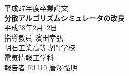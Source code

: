 
\begin{titlepage}
	\centering
	\vspace*{3.5cm}
	{\huge 平成27年度卒業論文}
	\vspace{1.5cm} \\
	{\huge \textbf{分散アルゴリズムシミュレータの改良}}
	\vspace{5cm} \\
	{\LARGE 平成28年2月12日}
	\vspace{1.0cm} \\
	{\LARGE 指導教員  濱田幸弘}
	\vspace{3.5cm} \\
	{\LARGE 明石工業高等専門学校}
	\vspace{1.0cm} \\
	{\LARGE 電気情報工学科}
	\vspace{1.0cm} \\
	{\LARGE 報告者  E1110 唐澤弘明}
\end{titlepage}
